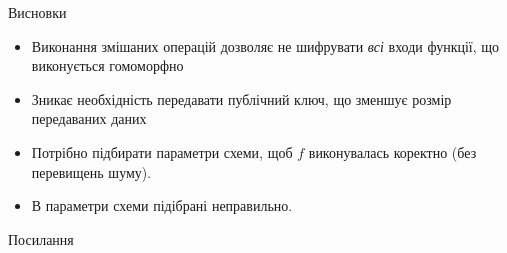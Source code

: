 \documentclass[pdf]{beamer}
\begin{document}
\begin{frame}{Висновки}

\begin{itemize}
	\item Виконання змішаних операцій дозволяє не шифрувати \emph{всі} входи функції, що виконується гомоморфно
	\item Зникає необхідність передавати публічний ключ, що зменшує розмір передаваних даних
	\item Потрібно підбирати параметри схеми, щоб \(f\) виконувалась коректно (без перевищень шуму).
	\item В \cite{YKPB13} параметри схеми підібрані неправильно.
\end{itemize}
\end{frame}


\begin{frame}{Посилання}
{}

\end{frame}
\end{document}
